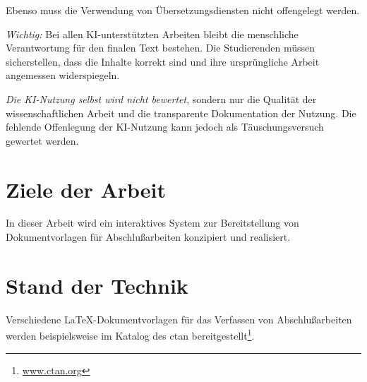 \documentclass[11pt,        %
  english,ngerman,          %
  paper=a4,                 %
  captions=tablesignature,  %
  listof=numbered,          %
  bibliography=totoc,       %
  headings=small,           %
  headinclude=false,        %
  footinclude=false,        %
  parskip=half-,            %
  oneside,                  %
  BCOR=15mm,                 %
  DIV=12                    %
  ]{scrbook}                %
\begin{document}
Ebenso muss die Verwendung von Übersetzungsdiensten nicht offengelegt werden.
  
\textit{Wichtig:} Bei allen KI-unterstützten Arbeiten bleibt die menschliche Verantwortung für den finalen Text bestehen. Die Studierenden müssen sicherstellen, dass die Inhalte korrekt sind und ihre ursprüngliche Arbeit angemessen widerspiegeln.
    
\textit{Die KI-Nutzung selbst wird nicht bewertet}, sondern nur die Qualität der wissenschaftlichen Arbeit und die transparente Dokumentation der Nutzung. Die fehlende Offenlegung der KI-Nutzung kann jedoch als Täuschungsversuch gewertet werden.

\section{Ziele der Arbeit}\label{sec:goals}


In dieser Arbeit wird ein interaktives System zur Bereitstellung von Dokumentvorlagen für Abschlußarbeiten konzipiert und realisiert.


\section{Stand der Technik}\label{sec:state_of_art}


Verschiedene \LaTeX-Dokumentvorlagen für das Verfassen von Abschlußarbeiten werden
beispielsweise im Katalog des \gls{ctan}
bereitgestellt\footnote{\href{https://www.ctan.org/}{www.ctan.org}}.

\end{document}

